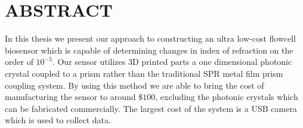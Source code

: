 \section*{ABSTRACT}
\hspace{0.25in}
In this thesis we present our approach to constructing an ultra low-cost flowcell biosensor which is capable of determining changes in index of refraction on the order of $10^{-5}$. Our sensor utilizes 3D printed parts a one dimensional photonic crystal coupled to a prism rather than the traditional SPR metal film prism coupling system. By using this method we are able to bring the cost of manufacturing the sensor to around $\$100$, excluding the photonic crystals which can be fabricated commercially. The largest cost of the system is a USB camera which is used to collect data.\\